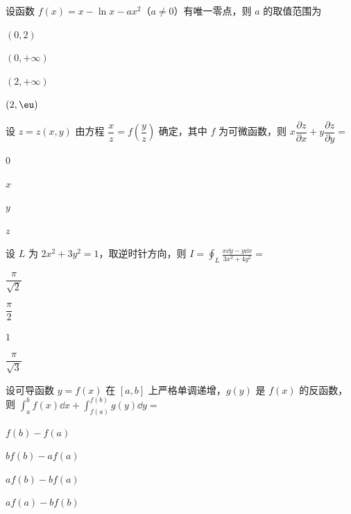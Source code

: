 
\begin{question}[index=1]
设函数 $f(x)=x-\ln x-ax^2$（$a\ne0$）有唯一零点，则 $a$ 的取值范围为
\begin{choices}[columns=4]
\item $(0,2)$
\item $(0,+\infty)$
\item $(2,+\infty)$
\item $(2,\eu)$
\end{choices}
\end{question}
\QuestionBreak

\begin{question}[index=2]
设 $z=z(x,y)$ 由方程 $\dfrac xz=f\!\left(\dfrac yz\right)$ 确定，其中 $f$ 为可微函数，则 $x\dfrac{\partial z}{\partial x}+y\dfrac{\partial z}{\partial y}=$
\begin{choices}[columns=4]
\item $0$
\item $x$
\item $y$
\item $z$
\end{choices}
\end{question}
\QuestionBreak

\begin{question}[index=3]
设 $L$ 为 $2x^2+3y^2=1$，取逆时针方向，则 $\displaystyle I=\oint_L\frac{x\dd y-y\dd x}{3x^2+4y^2}=$
\begin{choices}[columns=2]
\item $\dfrac\pi{\sqrt2}$
\item $\dfrac\pi2$
\item $1$
\item $\dfrac\pi{\sqrt3}$
\end{choices}
\end{question}
\QuestionBreak

\begin{question}[index=4]
设可导函数 $y=f(x)$ 在 $[a,b]$ 上严格单调递增，$g(y)$ 是 $f(x)$ 的反函数，则 $\displaystyle\int_a^bf(x)\dd x+\int_{f(a)}^{f(b)}g(y)\dd y=$
\begin{choices}[columns=4]
\item $f(b)-f(a)$
\item $bf(b)-af(a)$
\item $af(b)-bf(a)$
\item $af(a)-bf(b)$
\end{choices}
\end{question}
\QuestionBreak

